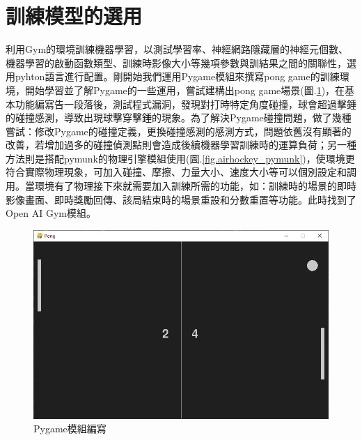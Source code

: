 \documentclass[14pt,a4paper]{report}  %
\begin{document}
\section{訓練模型的選用}
 利用Gym的環境訓練機器學習，以測試學習率、神經網路隱藏層的神經元個數、機器學習的啟動函數類型、訓練時影像大小等幾項參數與訓結果之間的關聯性，選用pyhton語言進行配置。剛開始我們運用Pygame模組來撰寫pong game的訓練環境，開始學習並了解Pygame的一些運用，嘗試建構出pong game場景(圖.\ref{fig.pong_pygame})，在基本功能編寫告一段落後，測試程式漏洞，發現對打時特定角度碰撞，球會超過擊錘的碰撞感測，導致出現球擊穿擊錘的現象。為了解決Pygame碰撞問題，做了幾種嘗試：修改Pygame的碰撞定義，更換碰撞感測的感測方式，問題依舊沒有顯著的改善，若增加過多的碰撞偵測點則會造成後續機器學習訓練時的運算負荷；另一種方法則是搭配pymunk的物理引擎模組使用(圖.\ref{fig.airhockey_pymunk})，使環境更符合實際物理現象，可加入碰撞、摩擦、力量大小、速度大小等可以個別設定和調用。當環境有了物理接下來就需要加入訓練所需的功能，如：訓練時的場景的即時影像畫面、即時獎勵回傳、該局結束時的場景重設和分數重置等功能。此時找到了Open AI Gym模組。\\
\begin{figure}[hbt!]
\begin{center}
\includegraphics[width=12cm]{pong_pygame}
\caption{\Large Pygame模組編寫}
\label{fig.pong_pygame}
\end{center}
\end{figure}
\end{document}

